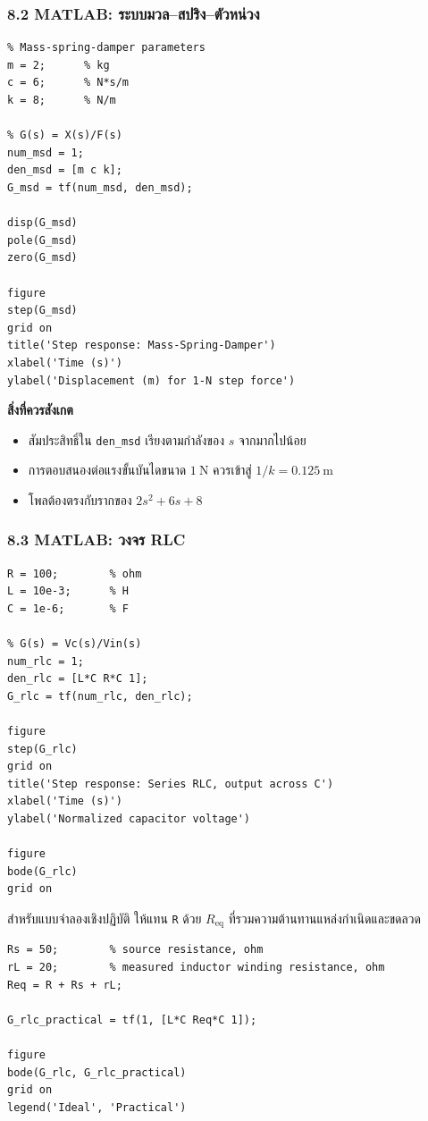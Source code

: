 \subsubsection{8.2 MATLAB: ระบบมวล–สปริง–ตัวหน่วง}

\begin{verbatim}
% Mass-spring-damper parameters
m = 2;      % kg
c = 6;      % N*s/m
k = 8;      % N/m

% G(s) = X(s)/F(s)
num_msd = 1;
den_msd = [m c k];
G_msd = tf(num_msd, den_msd);

disp(G_msd)
pole(G_msd)
zero(G_msd)

figure
step(G_msd)
grid on
title('Step response: Mass-Spring-Damper')
xlabel('Time (s)')
ylabel('Displacement (m) for 1-N step force')
\end{verbatim}

\textbf{สิ่งที่ควรสังเกต}

\begin{itemize}
    \item สัมประสิทธิ์ใน \texttt{den\_msd} เรียงตามกำลังของ $s$ จากมากไปน้อย
    \item การตอบสนองต่อแรงขั้นบันไดขนาด $1\ \text{N}$ ควรเข้าสู่ $1/k=0.125\ \text{m}$
    \item โพลต้องตรงกับรากของ $2s^2+6s+8$
\end{itemize}

\subsubsection{8.3 MATLAB: วงจร RLC}

\begin{verbatim}
R = 100;        % ohm
L = 10e-3;      % H
C = 1e-6;       % F

% G(s) = Vc(s)/Vin(s)
num_rlc = 1;
den_rlc = [L*C R*C 1];
G_rlc = tf(num_rlc, den_rlc);

figure
step(G_rlc)
grid on
title('Step response: Series RLC, output across C')
xlabel('Time (s)')
ylabel('Normalized capacitor voltage')

figure
bode(G_rlc)
grid on
\end{verbatim}

สำหรับแบบจำลองเชิงปฏิบัติ ให้แทน \texttt{R} ด้วย $R_{\text{eq}}$ ที่รวมความต้านทานแหล่งกำเนิดและขดลวด

\begin{verbatim}
Rs = 50;        % source resistance, ohm
rL = 20;        % measured inductor winding resistance, ohm
Req = R + Rs + rL;

G_rlc_practical = tf(1, [L*C Req*C 1]);

figure
bode(G_rlc, G_rlc_practical)
grid on
legend('Ideal', 'Practical')
\end{verbatim}

